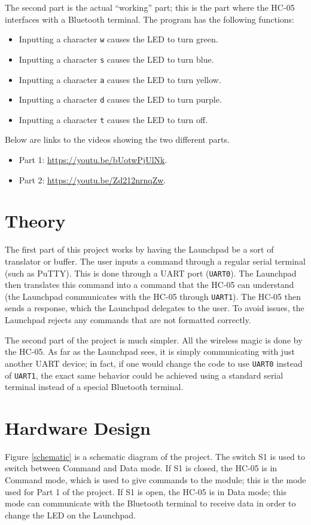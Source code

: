 \documentclass{article}
\renewcommand{\c}[1]{\texttt{#1}}
\begin{document}
The second part is the actual ``working'' part; this is
the part where the HC-05 interfaces with a Bluetooth
terminal. The program has the following functions:

\begin{itemize}
	\item Inputting a character \c{w} causes the LED to
	turn green.
	\item Inputting a character \c{s} causes the LED to
	turn blue.
	\item Inputting a character \c{a} causes the LED to
	turn yellow.
	\item Inputting a character \c{d} causes the LED to
	turn purple.
	\item Inputting a character \c{t} causes the LED to
	turn off.
\end{itemize}

Below are links to the videos showing the two different
parts.

\begin{itemize}
	\item Part 1: \url{https://youtu.be/bUotwPjUlNk}.
	\item Part 2: \url{https://youtu.be/Zd212nrnqZw}.
\end{itemize}

\section{Theory}
The first part of this project works by having the
Launchpad be a sort of translator or buffer.
The user inputs a command
through a regular serial terminal (such as PuTTY).
This is done through a UART port (\c{UART0}).
The
Launchpad then translates this command into a command
that the HC-05 can understand (the Launchpad communicates
with the HC-05 through \c{UART1}). The HC-05 then sends a
response, which the Launchpad delegates to the user.
To avoid issues, the Launchpad rejects any commands that
are not formatted correctly.

The second part of the project is much simpler. All the
wireless magic is done by the HC-05. As far as the Launchpad
sees, it is simply communicating with just another UART
device; in fact, if one would change the code to use
\c{UART0} instead of \c{UART1}, the exact same behavior
could be achieved using a standard serial terminal
instead of a special Bluetooth terminal.

\section{Hardware Design}
Figure \ref{schematic} is a schematic diagram of the project.
The switch S1 is used to switch between Command and Data mode.
If S1 is closed, the HC-05 is in Command mode,
which is used to give commands to the module; this is the
mode used for Part 1 of the project. If S1 is open,
the HC-05 is in Data mode; this mode can communicate with
the Bluetooth terminal to receive data in order to change
the LED on the Launchpad.
\end{document}
